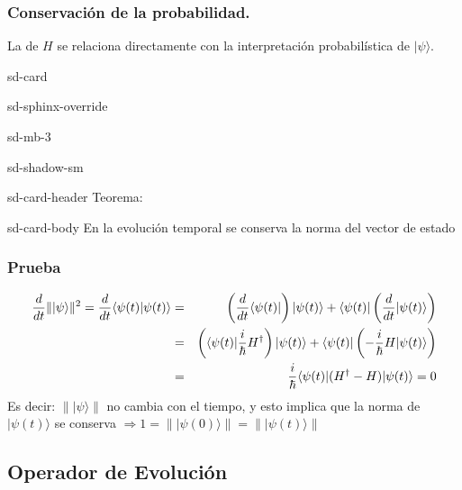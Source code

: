 \documentclass[letterpaper,10pt,english]{jupyterBook}
\newcommand{\bra}[1]{\langle #1|}
\newcommand{\ket}[1]{|#1\rangle}
\newcommand{\braket}[2]{\langle #1|#2\rangle}
\begin{document}
\subsubsection{Conservación de la probabilidad.}
\label{\detokenize{docs/Part_01_Formalismo/Chapter_02_01_Fundamentos_MC_myst:conservacion-de-la-probabilidad}}
\sphinxAtStartPar
La  de \(H\) se relaciona directamente con la interpretación probabilística de \(\ket{\psi}\).

\begin{sphinxuseclass}{sd-card}
\begin{sphinxuseclass}{sd-sphinx-override}
\begin{sphinxuseclass}{sd-mb-3}
\begin{sphinxuseclass}{sd-shadow-sm}
\begin{sphinxuseclass}{sd-card-header}
\sphinxAtStartPar
Teorema:

\end{sphinxuseclass}
\begin{sphinxuseclass}{sd-card-body}
\sphinxAtStartPar
En la evolución temporal se conserva la norma del vector de estado

\end{sphinxuseclass}
\end{sphinxuseclass}
\end{sphinxuseclass}
\end{sphinxuseclass}
\end{sphinxuseclass}\subsubsection*{Prueba}
\begin{eqnarray*}
\frac{d}{dt}\|\ket{\psi}\|^2 = \frac{d}{dt}\braket{\psi(t)}{\psi(t)} &=& \left(\rule{0mm}{3mm}\frac{d}{dt}\bra{\psi(t)}\right)\ket{\psi(t)} + 
\bra{\psi(t)}\left(\frac{d}{dt}\ket{\psi(t)} \right)\nonumber\\
&=& \left(\bra{\psi(t)}\frac{i}{\hbar}H^\dagger\right)\ket{\psi(t)} + \bra{\psi(t)}\left(-\frac{i}{\hbar}H\ket{\psi(t)} \right) \nonumber\\
&=&\frac{i}{\hbar} \bra{\psi(t)}(H^\dagger - H)\ket{\psi(t)} = 0
\end{eqnarray*}
\sphinxAtStartPar
Es decir: \(\|\ket{\psi}\|\) no cambia con el tiempo, y
esto implica que la norma de \(\ket{\psi(t)}\) se conserva \(\Rightarrow 1 = \|\ket{\psi(0)}\| =\|\ket{\psi(t)}\|\)


\subsection{Operador de Evolución}
\label{\detokenize{docs/Part_01_Formalismo/Chapter_02_01_Fundamentos_MC_myst:operador-de-evolucion}}
\sphinxAtStartPar
\end{document}
